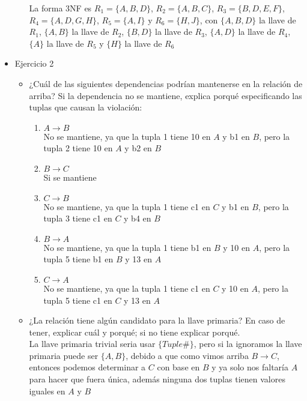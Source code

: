 \documentclass{article}
\begin{document}
\begin{itemize}
\begin{itemize}
        La forma 3NF es $R_1 = \{A,B,D\}$, $R_2 = \{A,B,C\}$, $R_3 = \{B,D,E,F\}$, $R_4 = \{A,D,G,H\}$, $R_5 = \{A,I\}$ y $R_6 = \{H,J\}$, con $\{A,B,D\}$ la llave de $R_1$, $\{A,B\}$ la llave de $R_2$, $\{B,D\}$ la llave de $R_3$, $\{A,D\}$ la llave de $R_4$, $\{A\}$ la llave de $R_5$ y $\{H\}$ la llave de $R_6$ \\
        
    \end{itemize}

    \item Ejercicio 2 \\
    \begin{itemize}
        \item ¿Cuál de las siguientes dependencias podrían mantenerse en la relación de arriba? Si la dependencia no se mantiene, explica porqué especificando las tuplas que causan la violación: \\
        \begin{enumerate}
            \item $A \rightarrow B$ \\
            No se mantiene, ya que la tupla 1 tiene 10 en $A$ y b1 en $B$, pero la tupla 2 tiene 10 en $A$ y b2 en $B$ \\

            \item $B \rightarrow C$ \\
            Si se mantiene \\

            \item $C \rightarrow B$ \\
            No se mantiene, ya que la tupla 1 tiene c1 en $C$ y b1 en $B$, pero la tupla 3 tiene c1 en $C$ y b4 en $B$ \\

            \item $B \rightarrow A$ \\
            No se mantiene, ya que la tupla 1 tiene b1 en $B$ y 10 en $A$, pero la tupla 5 tiene b1 en $B$ y 13 en $A$ \\

            \item $C \rightarrow A$ \\
            No se mantiene, ya que la tupla 1 tiene c1 en $C$ y 10 en $A$, pero la tupla 5 tiene c1 en $C$ y 13 en $A$ \\
        \end{enumerate}

        \item ¿La relación tiene algún candidato para la llave primaria? En caso de tener, explicar cuál y porqué; si no tiene explicar porqué. \\
        La llave primaria trivial seria usar $\{Tuple\#\}$, pero si la ignoramos la llave primaria puede ser $\{A,B\}$, debido a que como vimos arriba $B \rightarrow C$, entonces podemos determinar a $C$ con base en $B$ y ya solo nos faltaría $A$ para hacer que fuera única, además ninguna dos tuplas tienen valores iguales en $A$ y $B$ \\


\end{itemize}
\end{itemize}
\end{document}
